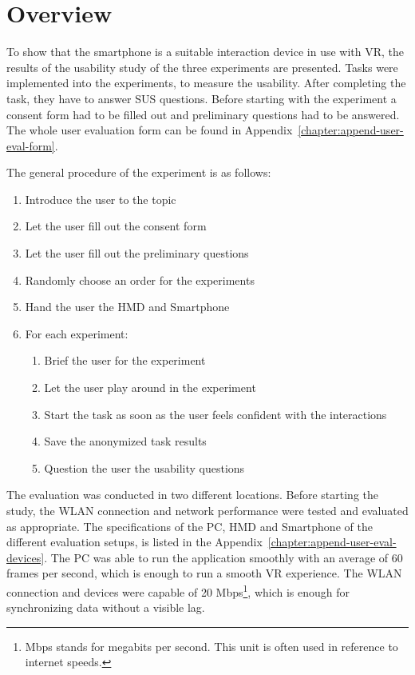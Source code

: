 \section{Overview}\label{section:evaluation-overview}

To show that the smartphone is a suitable interaction device in use with \ac{VR}, the results of the usability study of the three experiments are presented. Tasks were implemented into the experiments, to measure the usability. After completing the task, they have to answer \ac{SUS} questions. Before starting with the experiment a consent form had to be filled out and preliminary questions had to be answered. The whole user evaluation form can be found in Appendix~\ref{chapter:append-user-eval-form}. 

The general procedure of the experiment is as follows:
\begin{enumerate}
  \item Introduce the user to the topic
  \item Let the user fill out the consent form
  \item Let the user fill out the preliminary questions
  \item Randomly choose an order for the experiments
  \item Hand the user the \ac{HMD} and Smartphone
  \item For each experiment:
  \begin{enumerate}
  \item Brief the user for the experiment
  \item Let the user play around in the experiment
  \item Start the task as soon as the user feels confident with the interactions
  \item Save the anonymized task results
  \item Question the user the usability questions
  \end{enumerate}
\end{enumerate}

The evaluation was conducted in two different locations. Before starting the study, the \ac{WLAN} connection and network performance were tested and evaluated as appropriate. The specifications of the \ac{PC}, \ac{HMD} and Smartphone of the different evaluation setups, is listed in the Appendix~\ref{chapter:append-user-eval-devices}. The \ac{PC} was able to run the application smoothly with an average of 60 frames per second, which is enough to run a smooth \ac{VR} experience. The \ac{WLAN} connection and devices were capable of 20 Mbps\footnote{Mbps stands for megabits per second. This unit is often used in reference to internet speeds.}, which is enough for synchronizing data without a visible lag.

